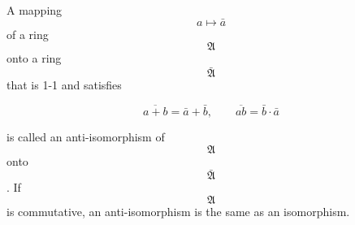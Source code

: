 A mapping $$a \mapsto \bar{a}$$ of a ring $$\mathfrak{A}$$ onto a ring $$\bar{\mathfrak{A}}$$ that is 1-1 and satisfies

$$\overline{a + b} = \bar{a} + \bar{b}, \qquad \overline{ab} = \bar{b} \cdot \bar{a}$$

is called an anti-isomorphism of $$\mathfrak{A}$$ onto $$\bar{\mathfrak{A}}$$. If $$\mathfrak{A}$$ is commutative, an anti-isomorphism is the same as an isomorphism.
